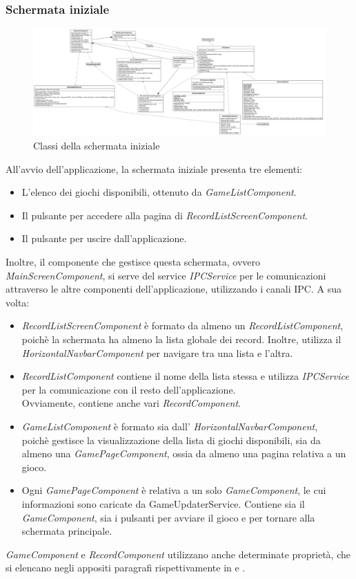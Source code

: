 \subsubsection{Schermata iniziale}
\begin{figure}[h]
    \centering
    \includegraphics[width=340pt]{images/prog/MainScreen.png}
    \caption{Classi della schermata iniziale}
    \label{fig:schermataIniziale}
\end{figure}
All'avvio dell'applicazione, la schermata iniziale presenta tre elementi:
\begin{itemize}
    \item L'elenco dei giochi disponibili, ottenuto da \emph{GameListComponent}.
    \item Il pulsante per accedere alla pagina di \emph{RecordListScreenComponent}.
    \item Il pulsante per uscire dall'applicazione.
\end{itemize}
Inoltre, il componente che gestisce questa schermata, ovvero \emph{MainScreenComponent}, si serve del service \emph{IPCService} per le comunicazioni attraverso le altre componenti dell'applicazione, utilizzando i canali IPC.
A sua volta:
\begin{itemize}
    \item \emph{RecordListScreenComponent} è formato da almeno un \emph{RecordListComponent}, poichè la schermata ha almeno la lista globale dei record. Inoltre, utilizza il \emph{HorizontalNavbarComponent} per navigare tra una lista e l'altra.
    \item \emph{RecordListComponent} contiene il nome della lista stessa e utilizza \emph{IPCService} per la comunicazione con il resto dell'applicazione.\\ Ovviamente, contiene anche vari \emph{RecordComponent}.
    \item \emph{GameListComponent} è formato sia dall' \emph{HorizontalNavbarComponent},\\ poichè gestisce la visualizzazione della lista di giochi disponibili, sia da almeno una \emph{GamePageComponent}, ossia da almeno una pagina relativa a un gioco.
    \item Ogni \emph{GamePageComponent} è relativa a un solo \emph{GameComponent}, le cui informazioni sono caricate da GameUpdaterService. Contiene sia il \emph{GameComponent}, sia i pulsanti per avviare il gioco e per tornare alla schermata principale.
\end{itemize}
\emph{GameComponent} e \emph{RecordComponent} utilizzano anche determinate proprietà, che si elencano negli appositi paragrafi rispettivamente in  e .
\newpage
